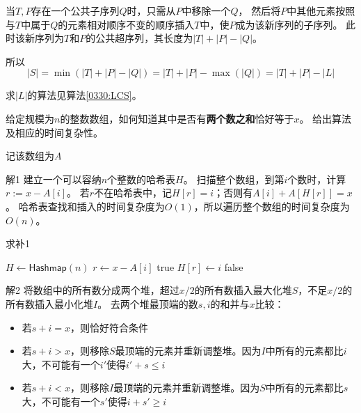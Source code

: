 \begin{questions}
\begin{parts}
\begin{solution}
            当$T,P$存在一个公共子序列$Q$时，只需从$P$中移除一个$Q$，
            然后将$P$中其他元素按照与$T$中属于$Q$的元素相对顺序不变的顺序插入$T$中，使$P$成为该新序列的子序列。
            此时该新序列为$T$和$P$的公共超序列，其长度为$|T| + |P| - |Q| $。

            所以\[
                |S| = \min (|T| + |P| - |Q|) = |T| + |P| - \max (|Q|) = |T| + |P| - |L|
            \]

            求$|L|$的算法见算法\ref{0330:LCS}。
        \end{solution}
    \end{parts}

    \question 给定规模为$n$的整数数组，如何知道其中是否有\textbf{两个数之和}恰好等于$x$。
    给出算法及相应的时间复杂性。
    \begin{solution}
        记该数组为$A$

        \textsf{解1}\quad
        建立一个可以容纳$n$个整数的哈希表$H$。
        扫描整个数组，到第$i$个数时，计算$r := x - A[i]$。
        若$r$不在哈希表中，记$H[r] = i$；否则有$A[i] + A\left[H[r]\right] = x$。
        哈希表查找和插入的时间复杂度为$O(1)$，所以遍历整个数组的时间复杂度为$O(n)$。

        \begin{algorithm}[H]
            \caption{求补1}\label{0330:Composite1}
            \begin{algorithmic}[1]
                \State $H \gets \mathsf{Hashmap}(n)$
                \State $r \gets x - A[i]$
                \State \Return \textsf{true} 
                \Else
                \State $H[r] \gets i$
                \EndIf
                \EndFor
                \State \Return \textsf{false}
            \end{algorithmic}
        \end{algorithm}

        \textsf{解2}
        将数组中的所有数分成两个堆，超过$x/2$的所有数插入最大化堆$S$，不足$x/2$的所有数插入最小化堆$I$。
        去两个堆最顶端的数$s,i$的和并与$x$比较：
        \begin{itemize}
            \item 若$s + i = x$，则恰好符合条件
            \item 若$s + i > x$，则移除$S$最顶端的元素并重新调整堆。因为$I$中所有的元素都比$i$大，不可能有一个$i'$使得$i' + s \le i$
            \item 若$s + i < x$，则移除$I$最顶端的元素并重新调整堆。因为$S$中所有的元素都比$s$大，不可能有一个$s'$使得$i + s' \ge i$
        \end{itemize}


\end{solution}
\end{questions}
